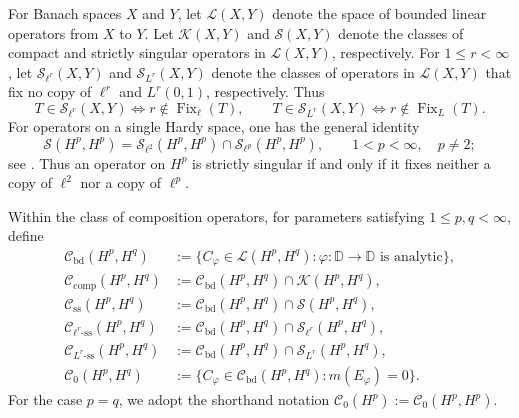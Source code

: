 \documentclass[11pt, reqno]{amsart}
\theoremstyle{definition}
\theoremstyle{remark}
\newcommand{\D}{\mathbb{D}}
\newcommand{\CB}{\mathcal C_{\mathrm{bd}}}
\newcommand{\CK}{\mathcal C_{\mathrm{comp}}}
\newcommand{\CS}{\mathcal C_{\mathrm{ss}}}
\newcommand{\CSell}[1]{\mathcal C_{\ell^{#1}\text{-ss}}}
\newcommand{\CSL}[1]{\mathcal C_{L^{#1}\text{-ss}}}
\begin{document}
For Banach spaces \(X\) and \(Y\), let \(\mathcal L(X,Y)\) denote the
space of bounded linear operators from \(X\) to \(Y\). Let
\(\mathcal K(X,Y)\) and \(\mathcal S(X,Y)\) denote the classes of
compact and strictly singular operators in \(\mathcal L(X,Y)\),
respectively. For \(1\le r<\infty\), let
\(\mathcal S_{\ell^r}(X,Y)\) and \(\mathcal S_{L^r}(X,Y)\) denote the
classes of operators in \(\mathcal L(X,Y)\) that fix no copy of
\(\ell^r\) and \(L^r(0,1)\), respectively. Thus
\[
T\in\mathcal S_{\ell^r}(X,Y)
\Longleftrightarrow
r\notin\operatorname{Fix}_{\ell}(T),
\qquad
T\in\mathcal S_{L^r}(X,Y)
\Longleftrightarrow
r\notin\operatorname{Fix}_{L}(T).
\]
For operators on a single Hardy space, one has the general identity
\[
        \mathcal S(H^p,H^p)
        =
        \mathcal S_{\ell^2}(H^p,H^p)
        \cap
        \mathcal S_{\ell^p}(H^p,H^p),
        \qquad
        1<p<\infty,\quad p\ne2;
\]
see \cite[(1.4)]{LNST2017}. Thus an operator on \(H^p\) is strictly
singular if and only if it fixes neither a copy of \(\ell^2\) nor a
copy of \(\ell^p\).

Within the class of composition operators, for parameters satisfying \(1\le p,q<\infty\), define
  \[
\begin{aligned}
\CB(H^p,H^q)
&:=
\bigl\{
C_\varphi\in\mathcal L(H^p,H^q):
\varphi:\D\to\D\text{ is analytic}
\bigr\},\\
\CK(H^p,H^q)
&:=
\CB(H^p,H^q)\cap\mathcal K(H^p,H^q),\\
\CS(H^p,H^q)
&:=
\CB(H^p,H^q)\cap\mathcal S(H^p,H^q),\\
\CSell{r}(H^p,H^q)
&:=
\CB(H^p,H^q)\cap\mathcal S_{\ell^r}(H^p,H^q),\\
\CSL{r}(H^p,H^q)
&:=
\CB(H^p,H^q)\cap\mathcal S_{L^r}(H^p,H^q),\\
\mathcal C_0(H^p,H^q)
&:=
\bigl\{
C_\varphi\in\CB(H^p,H^q):
m(E_\varphi)=0
\bigr\}.
\end{aligned}
\]
For the case \(p=q\), we adopt the shorthand notation
 \(
\mathcal C_0(H^p):=\mathcal C_0(H^p,H^p).
\)

 
\end{document}
